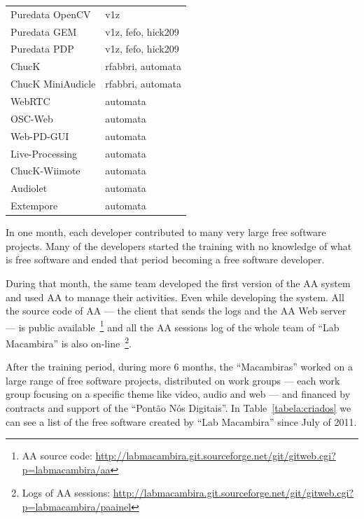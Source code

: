 \documentclass[letterpaper]{article}
\begin{document}
\begin{table}
\begin{tabular}{|l|l|}
        Puredata OpenCV       & v1z                                 \\
        Puredata GEM          & v1z, fefo, hick209                  \\
        Puredata PDP          & v1z, fefo, hick209                  \\
        ChucK                 & rfabbri, automata                   \\
        ChucK MiniAudicle     & rfabbri, automata                   \\
        WebRTC                & automata                            \\
        OSC-Web               & automata                            \\
        Web-PD-GUI            & automata                            \\
        Live-Processing       & automata                            \\
        ChucK-Wiimote         & automata                            \\
        Audiolet              & automata                            \\
        Extempore             & automata                            \\
        \hline
    \end{tabular}
    \label{tabela:contribuicoes}
\end{table}

In one month, each developer contributed to many very large free software
projects. Many of the developers started the training with no knowledge of what
is free software and ended that period becoming a free software developer.

During that month, the same team developed the first version of the AA system
and used AA to manage their activities. Even while developing the system. All
the source code of AA --- the client that sends the logs and the AA Web server
--- is public available~\footnote{AA source code:
  \url{http://labmacambira.git.sourceforge.net/git/gitweb.cgi?p=labmacambira/aa}}
and all the AA sessions log of the whole team of ``Lab Macambira'' is also
on-line~\footnote{Logs of AA sessions:
  \url{http://labmacambira.git.sourceforge.net/git/gitweb.cgi?p=labmacambira/paainel}}.

After the training period, during more 6 months, the ``Macambiras'' worked on a
large range of free software projects, distributed on work groups --- each work
group focusing on a specific theme like video, audio and web --- and financed by
contracts and support of the ``Pont\~{a}o N\'{o}s Digitais''. In
Table~\ref{tabela:criados} we can see a list of the free software created by
``Lab Macambira'' since July of 2011.
\end{document}
